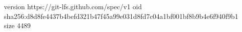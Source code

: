 version https://git-lfs.github.com/spec/v1
oid sha256:d8d8fe4437b4befd321b47f45a99e031d8fd7c04a1bf001bf8b9b4e6f940f9b1
size 4489

